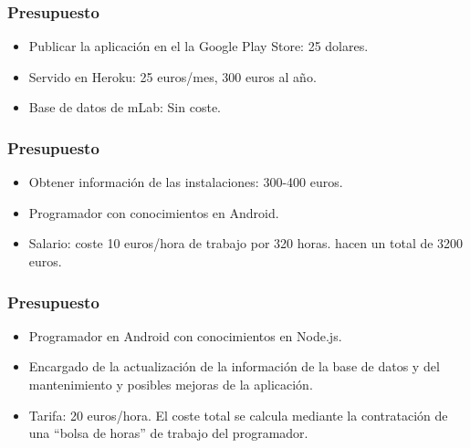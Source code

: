 \begin{frame}
	\frametitle{Presupuesto}
		\begin{itemize}
			\item Publicar la aplicación en el la Google Play Store: 25 dolares.
			\item Servido en Heroku: 25 euros/mes, 300 euros al año.
			\item Base de datos de mLab: Sin coste.
		\end{itemize}
	\endblock{}
\end{frame}

\begin{frame}
	\frametitle{Presupuesto}
		\begin{itemize}
			\item Obtener información de las instalaciones: 300-400 euros.
			\item Programador con conocimientos en Android.
			\item Salario: coste 10 euros/hora de trabajo por 320 horas. hacen un total de 3200 euros.
		\end{itemize}
	\endblock{}
\end{frame}


\begin{frame}
	\frametitle{Presupuesto}
		\begin{itemize}
			\item Programador en Android con conocimientos en Node.js.
			\item Encargado de la actualización de la información de la base de datos y del mantenimiento y posibles mejoras de la aplicación.
			\item Tarifa: 20 euros/hora. El coste total se calcula mediante la contratación de una ``bolsa de horas'' de trabajo del programador.
		\end{itemize}
	\endblock{}
\end{frame} 